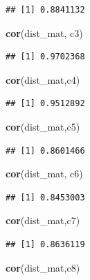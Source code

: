 \documentclass[]{article}
\newenvironment{Shaded}{\begin{snugshade}}{\end{snugshade}}
\newcommand{\KeywordTok}[1]{\textcolor[rgb]{0.13,0.29,0.53}{\textbf{#1}}}
\newcommand{\NormalTok}[1]{#1}
\begin{document}
\begin{verbatim}
## [1] 0.8841132
\end{verbatim}

\begin{Shaded}
\begin{Highlighting}[]
\KeywordTok{cor}\NormalTok{(dist_mat, c3)}
\end{Highlighting}
\end{Shaded}

\begin{verbatim}
## [1] 0.9702368
\end{verbatim}

\begin{Shaded}
\begin{Highlighting}[]
\KeywordTok{cor}\NormalTok{(dist_mat,c4)}
\end{Highlighting}
\end{Shaded}

\begin{verbatim}
## [1] 0.9512892
\end{verbatim}

\begin{Shaded}
\begin{Highlighting}[]
\KeywordTok{cor}\NormalTok{(dist_mat,c5)}
\end{Highlighting}
\end{Shaded}

\begin{verbatim}
## [1] 0.8601466
\end{verbatim}

\begin{Shaded}
\begin{Highlighting}[]
\KeywordTok{cor}\NormalTok{(dist_mat, c6)}
\end{Highlighting}
\end{Shaded}

\begin{verbatim}
## [1] 0.8453003
\end{verbatim}

\begin{Shaded}
\begin{Highlighting}[]
\KeywordTok{cor}\NormalTok{(dist_mat,c7)}
\end{Highlighting}
\end{Shaded}

\begin{verbatim}
## [1] 0.8636119
\end{verbatim}

\begin{Shaded}
\begin{Highlighting}[]
\KeywordTok{cor}\NormalTok{(dist_mat,c8)}
\end{Highlighting}
\end{Shaded}
\end{document}
